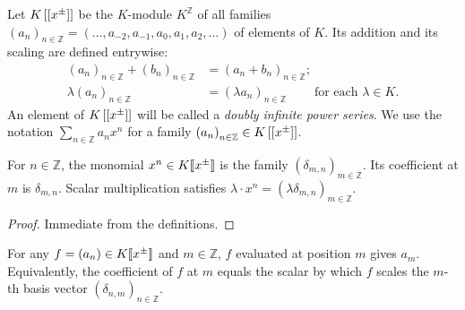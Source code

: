 \begin{definition}
\label{def.fps.laure.double}
\leantarget
\leanok
Let $K\left[  \left[  x^{\pm}\right]  \right]  $
be the $K$-module $K^{\mathbb{Z}}$ of all families $\left(  a_{n}\right)
_{n\in\mathbb{Z}}=\left(  \ldots,a_{-2},a_{-1},a_{0},a_{1},a_{2}%
,\ldots\right)  $ of elements of $K$. Its addition and its scaling are defined
entrywise:%
\begin{align*}
\left(  a_{n}\right)  _{n\in\mathbb{Z}}+\left(  b_{n}\right)  _{n\in
\mathbb{Z}}  &  =\left(  a_{n}+b_{n}\right)  _{n\in\mathbb{Z}};\\
\lambda\left(  a_{n}\right)  _{n\in\mathbb{Z}}  &  =\left(  \lambda
a_{n}\right)  _{n\in\mathbb{Z}}\ \ \ \ \ \ \ \ \ \ \text{for each }\lambda\in
K.
\end{align*}
An element of $K\left[  \left[  x^{\pm}\right]  \right]  $ will be called a
\emph{doubly infinite power series}. We use the notation $\sum_{n\in\mathbb{Z}}a_{n}x^{n}$ for a family
$\left(  a_{n}\right)  _{n\in\mathbb{Z}}\in K\left[  \left[  x^{\pm}\right]
\right]  $.
\end{definition}

\begin{lemma}
\label{lem.fps.laure.double-single}
\leanhelper
\leanok
For $n \in \mathbb{Z}$, the monomial $x^n \in K[\![ x^{\pm} ]\!]$
is the family $(\delta_{m,n})_{m \in \mathbb{Z}}$.
Its coefficient at $m$ is $\delta_{m,n}$.
Scalar multiplication satisfies $\lambda \cdot x^n = (\lambda \delta_{m,n})_{m \in \mathbb{Z}}$.
\end{lemma}

\begin{proof}
\leanok
Immediate from the definitions.
\end{proof}

\begin{lemma}
\label{lem.fps.laure.double-decomp}
\leanhelper
\leanok
For any $f = (a_n) \in K[\![ x^{\pm} ]\!]$ and $m \in \mathbb{Z}$,
$f$ evaluated at position $m$ gives $a_m$.
Equivalently, the coefficient of $f$ at $m$ equals the scalar
by which $f$ scales the $m$-th basis vector $(\delta_{n,m})_{n \in \mathbb{Z}}$.
\end{lemma}


